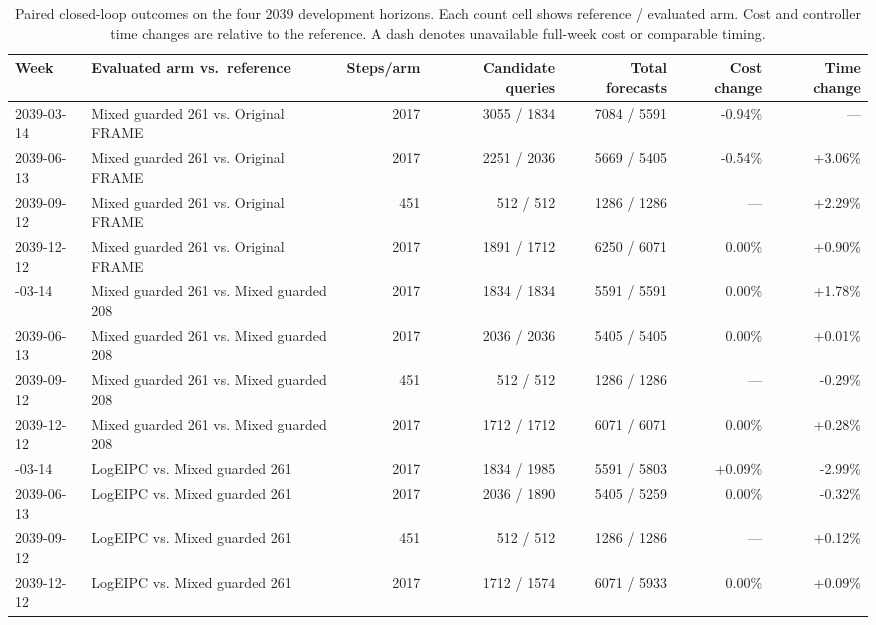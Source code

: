 \begin{table}[t]
\centering
\caption{Paired closed-loop outcomes on the four 2039 development horizons. Each count cell shows reference / evaluated arm. Cost and controller time changes are relative to the reference. A dash denotes unavailable full-week cost or comparable timing.}
\label{tab:closed}
\small
\setlength{\tabcolsep}{5pt}
\begin{tabular}{@{}llrrrrr@{}}
\toprule
Week & Evaluated arm vs.\ reference & Steps/arm & Candidate queries & Total forecasts & Cost change & Time change\\
\midrule
2039-03-14 & Mixed guarded 261 vs. Original FRAME & 2017 & 3055 / 1834 & 7084 / 5591 & -0.94\% & --- \\
2039-06-13 & Mixed guarded 261 vs. Original FRAME & 2017 & 2251 / 2036 & 5669 / 5405 & -0.54\% & +3.06\% \\
2039-09-12 & Mixed guarded 261 vs. Original FRAME & 451 & 512 / 512 & 1286 / 1286 & --- & +2.29\% \\
2039-12-12 & Mixed guarded 261 vs. Original FRAME & 2017 & 1891 / 1712 & 6250 / 6071 & 0.00\% & +0.90\% \\
\addlinespace
2039-03-14 & Mixed guarded 261 vs. Mixed guarded 208 & 2017 & 1834 / 1834 & 5591 / 5591 & 0.00\% & +1.78\% \\
2039-06-13 & Mixed guarded 261 vs. Mixed guarded 208 & 2017 & 2036 / 2036 & 5405 / 5405 & 0.00\% & +0.01\% \\
2039-09-12 & Mixed guarded 261 vs. Mixed guarded 208 & 451 & 512 / 512 & 1286 / 1286 & --- & -0.29\% \\
2039-12-12 & Mixed guarded 261 vs. Mixed guarded 208 & 2017 & 1712 / 1712 & 6071 / 6071 & 0.00\% & +0.28\% \\
\addlinespace
2039-03-14 & LogEIPC vs. Mixed guarded 261 & 2017 & 1834 / 1985 & 5591 / 5803 & +0.09\% & -2.99\% \\
2039-06-13 & LogEIPC vs. Mixed guarded 261 & 2017 & 2036 / 1890 & 5405 / 5259 & 0.00\% & -0.32\% \\
2039-09-12 & LogEIPC vs. Mixed guarded 261 & 451 & 512 / 512 & 1286 / 1286 & --- & +0.12\% \\
2039-12-12 & LogEIPC vs. Mixed guarded 261 & 2017 & 1712 / 1574 & 6071 / 5933 & 0.00\% & +0.09\% \\
\bottomrule
\end{tabular}
\end{table}
